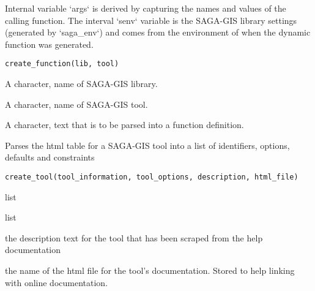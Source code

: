 \documentclass[a4paper]{book}
\begin{document}
%
\begin{Description}
Internal variable `args` is derived by capturing the names and values of the
calling function. The interval `senv` variable is the SAGA-GIS library
settings (generated by `saga\_env`) and comes from the environment of when the
dynamic function was generated.
\end{Description}
%
\begin{Usage}
\begin{verbatim}
create_function(lib, tool)
\end{verbatim}
\end{Usage}
%
\begin{Arguments}
\begin{ldescription}
\item[\code{lib}] A character, name of SAGA-GIS library.

\item[\code{tool}] A character, name of SAGA-GIS tool.
\end{ldescription}
\end{Arguments}
%
\begin{Value}
A character, text that is to be parsed into a function definition.
\end{Value}
%
\begin{Description}
Parses the html table for a SAGA-GIS tool into a list of identifiers,
options, defaults and constraints
\end{Description}
%
\begin{Usage}
\begin{verbatim}
create_tool(tool_information, tool_options, description, html_file)
\end{verbatim}
\end{Usage}
%
\begin{Arguments}
\begin{ldescription}
\item[\code{tool\_information}] list

\item[\code{tool\_options}] list

\item[\code{description}] the description text for the tool that has been scraped
from the help documentation

\item[\code{html\_file}] the name of the html file for the tool's documentation.
Stored to help linking with online documentation.
\end{ldescription}
\end{Arguments}
\end{document}
